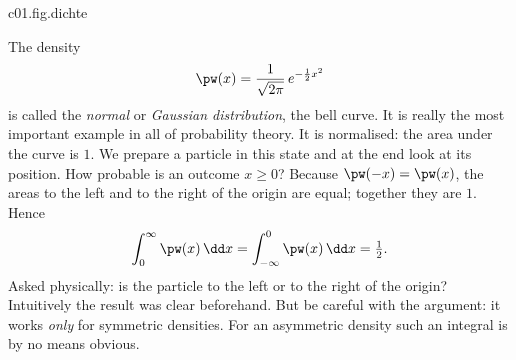 \begin{tpcfigure}{c01.fig.dichte}

  \caption{(a) The density of the Gaussian distribution of Example~\ref{c01.ex.gauss}. The
    probability that the outcome lies between real endpoints $a \leq b$ is the hatched
    area and not the height of the curve. (b) The uniform density of
    equation~\eqref{c01.eq.gleich}: it has height $2$, and the area under it is $1$.}
\end{tpcfigure}

\begin{example}\label{c01.ex.gauss}
  The density
  \begin{equation}\label{c01.eq.gauss}
    \pw(x) = \frac{1}{\sqrt{2\pi}}\, e^{-\frac12 x^2}
  \end{equation}
  is called the \emph{normal} or \emph{Gaussian distribution}, the bell curve. It is really
  the most important example in all of probability theory. It is normalised: the area under
  the curve is $1$. We prepare a particle in this state and at the end look
  at its position. How probable is an outcome $x \geq 0$? Because $\pw(-x) = \pw(x)$, the
  areas to the left and to the right of the origin are equal; together they are $1$.
  Hence
  \begin{equation}\label{c01.eq.gauss-halb}
    \int_0^\infty \pw(x)\,\dd x = \int_{-\infty}^0 \pw(x)\,\dd x = \tfrac12 .
  \end{equation}
  Asked physically: is the particle to the left or to the right of the origin? Intuitively
  the result was clear beforehand. But be careful with the argument: it works \emph{only}
  for symmetric densities. For an asymmetric density such an integral is by no means
  obvious.
\end{example}

